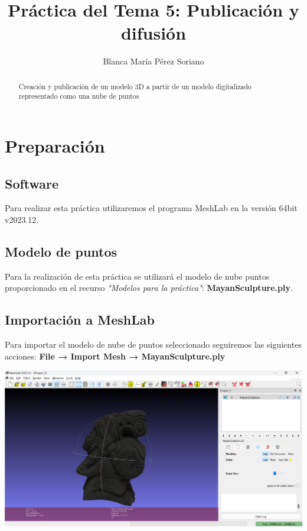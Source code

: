 \documentclass[options]{article}
\title{Práctica del Tema 5: Publicación y difusión}
\author{Blanca María Pérez Soriano}
\begin{document}
\maketitle
\begin{abstract}
    \begin{center}
        Creación y publicación de un modelo 3D a partir de un modelo digitalizado representado como una nube de puntos
    \end{center}   
\end{abstract}

\pagebreak

\section{Preparación}
\subsection{Software}
Para realizar esta práctica utilizaremos el programa MeshLab en la versión 64bit v2023.12.

\subsection{Modelo de puntos}
Para la realización de esta práctica se utilizará el modelo de nube puntos proporcionado en el recurso \textit{"Modelos para la práctica"}: \textbf{MayanSculpture.ply}.

\subsection{Importación a MeshLab}
Para importar el modelo de nube de puntos seleccionado seguiremos las siguientes acciones: \textbf{File → Import Mesh → MayanSculpture.ply}
\begin{center}
    \includegraphics[scale=0.35]{images/presentacion_importacion.png}    
\end{center}
\end{document}

